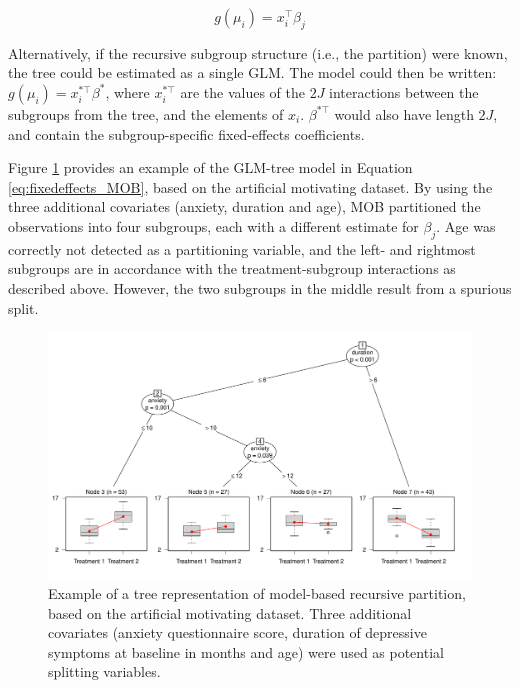 \documentclass[nobf,doc]{apa}
\begin{document}
\begin{equation}
\label{eq:fixedeffects_MOB}
	g(\mu_{i}) = x_{i}^{\top}\beta_{j}
\end{equation}

Alternatively, if the recursive subgroup structure (i.e., the partition) were known, the tree could be estimated as a single GLM. The model could then be written: $g(\mu_{i}) = x_{i}^{* \top}\beta^{*}$, where $x_{i}^{*\top}$ are the values of the $2J$ interactions between the subgroups from the tree, and the elements of $x_{i}$. $\beta^{* \top}$ would also have length $2J$, and contain the subgroup-specific fixed-effects coefficients.

Figure \ref{fig:example_mobtree} provides an example of the GLM-tree model in Equation \ref{eq:fixedeffects_MOB}, based on the artificial motivating dataset. By using the three additional covariates (anxiety, duration and age), MOB partitioned the observations into four subgroups, each with a different estimate for $\beta_j$. Age was correctly not detected as a partitioning variable, and the left- and rightmost subgroups are in accordance with the treatment-subgroup interactions as described above. However, the two subgroups in the middle result from a spurious split.

\begin{figure}[!h]
    \includegraphics[width=15cm]{glmtree_example.pdf}
    \caption{Example of a tree representation of model-based recursive partition, based on the artificial motivating dataset. Three additional covariates (anxiety questionnaire score, duration of depressive symptoms at baseline in months and age) were used as potential splitting variables.}
    \label{fig:example_mobtree}
\end{figure}
\end{document}
